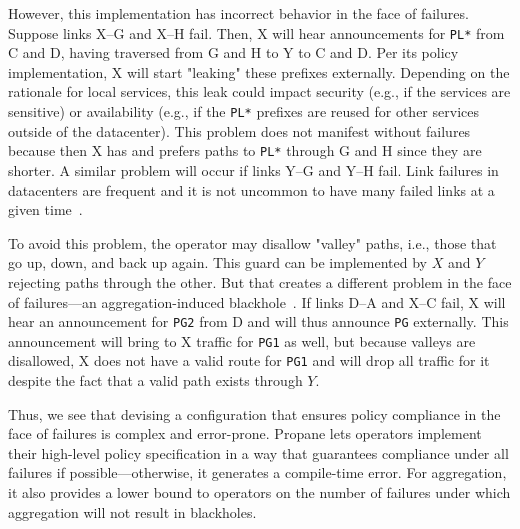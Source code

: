 \documentclass[10pt]{sigalternate052015}
\newcommand{\sysname}{{\small \sf Propane}\xspace}
\newcommand{\CD}[1]{\texttt{\small #1}}  %
\begin{document}
However, this implementation has incorrect behavior in the face of failures. Suppose links X--G and X--H fail. Then, X will hear announcements for \CD{PL*} from C and D, having traversed from G and H to Y to C and D. Per its policy implementation, X will start "leaking" these prefixes externally. Depending on the rationale for local services, this leak could impact security (e.g., if the services are sensitive) or availability (e.g., if the \CD{PL*} prefixes are reused for other services outside of the datacenter). This problem does not manifest without failures because then X has and prefers paths to \CD{PL*} through G and H since they are shorter. A similar problem will occur if links Y--G and Y--H fail.
Link failures in datacenters are frequent and it is not uncommon to have many failed links at a given time~\cite{dc-failure-study}.

To avoid this problem, the operator may disallow "valley" paths, i.e., those that go up, down, and back up again. This guard can be implemented by $X$ and $Y$ rejecting paths through the other. But that creates a different problem in the face of failures---an aggregation-induced blackhole~\cite{route-aggregation}. If links D--A and X--C fail, X will hear an announcement for \CD{PG2} from D and will thus announce \CD{PG} externally. This announcement will bring to X traffic for \CD{PG1} as well, but because valleys are disallowed, X does not have a valid route for \CD{PG1} and will drop all traffic for it despite the fact that a valid path exists through $Y$.

Thus, we see that devising a configuration that ensures policy compliance in the face of failures is complex and error-prone. \sysname lets operators implement their high-level policy specification in a way that guarantees compliance under all failures if possible---otherwise, it generates a compile-time error. For aggregation, it also provides a lower bound to operators on the number of failures under which aggregation will not result in blackholes.
\end{document}
